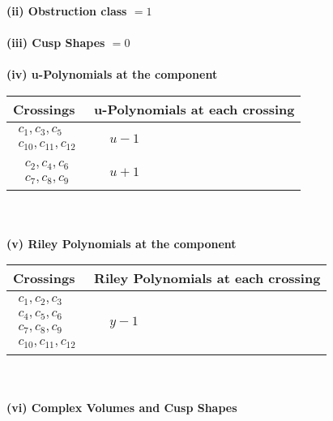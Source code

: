 \documentclass[1p]{elsarticle_modified}
\theoremstyle{definition}
\begin{document}
\flushleft \textbf{(ii) Obstruction class $= 1$}\\~\\
\flushleft \textbf{(iii) Cusp Shapes $= 0$}\\~\\
\newpage\renewcommand{\arraystretch}{1}
\flushleft \textbf{(iv) u-Polynomials at the component}\newline \\
\begin{tabular}{m{50pt}|m{274pt}}
Crossings & \hspace{64pt}u-Polynomials at each crossing \\
\hline $$\begin{aligned}c_{1},c_{3},c_{5}\\c_{10},c_{11},c_{12}\end{aligned}$$&$\begin{aligned}
&u-1
\end{aligned}$\\
\hline $$\begin{aligned}c_{2},c_{4},c_{6}\\c_{7},c_{8},c_{9}\end{aligned}$$&$\begin{aligned}
&u+1
\end{aligned}$\\
\hline
\end{tabular}\\~\\
\newpage\renewcommand{\arraystretch}{1}
\flushleft \textbf{(v) Riley Polynomials at the component}\newline \\
\begin{tabular}{m{50pt}|m{274pt}}
Crossings & \hspace{64pt}Riley Polynomials at each crossing \\
\hline $$\begin{aligned}c_{1},c_{2},c_{3}\\c_{4},c_{5},c_{6}\\c_{7},c_{8},c_{9}\\c_{10},c_{11},c_{12}\end{aligned}$$&$\begin{aligned}
&y-1
\end{aligned}$\\
\hline
\end{tabular}\\~\\
\newpage\flushleft \textbf{(vi) Complex Volumes and Cusp Shapes}
\end{document}
